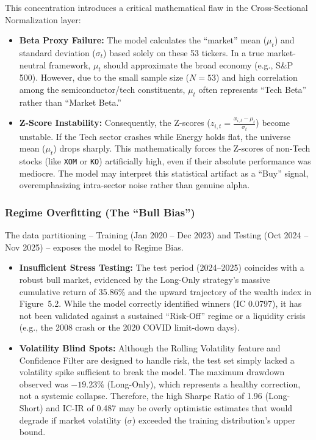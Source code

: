 \documentclass[twoside,final]{hcmut-report}
\begin{document}
This concentration introduces a critical mathematical flaw in the Cross-Sectional Normalization layer:
\begin{itemize}
  \item \textbf{Beta Proxy Failure:} The model calculates the ``market'' mean ($\mu_t$) and standard deviation ($\sigma_t$) based solely on these 53 tickers. In a true market-neutral framework, $\mu_t$ should approximate the broad economy (e.g., S\&P 500). However, due to the small sample size ($N=53$) and high correlation among the semiconductor/tech constituents, $\mu_t$ often represents ``Tech Beta'' rather than ``Market Beta.''
  \item \textbf{Z-Score Instability:} Consequently, the Z-scores \big($z_{i,t} = \frac{x_{i,t} - \mu_t}{\sigma_t}$\big) become unstable. If the Tech sector crashes while Energy holds flat, the universe mean ($\mu_t$) drops sharply. This mathematically forces the Z-scores of non-Tech stocks (like \texttt{XOM} or \texttt{KO}) artificially high, even if their absolute performance was mediocre. The model may interpret this statistical artifact as a ``Buy'' signal, overemphasizing intra-sector noise rather than genuine alpha.
\end{itemize}

\subsubsection{Regime Overfitting (The ``Bull Bias'')}
The data partitioning -- Training (Jan 2020 -- Dec 2023) and Testing (Oct 2024 -- Nov 2025) -- exposes the model to Regime Bias.
\begin{itemize}
  \item \textbf{Insufficient Stress Testing:} The test period (2024--2025) coincides with a robust bull market, evidenced by the Long-Only strategy’s massive cumulative return of 35.86\% and the upward trajectory of the wealth index in Figure~5.2. While the model correctly identified winners (IC 0.0797), it has not been validated against a sustained ``Risk-Off'' regime or a liquidity crisis (e.g., the 2008 crash or the 2020 COVID limit-down days).
  \item \textbf{Volatility Blind Spots:} Although the Rolling Volatility feature and Confidence Filter are designed to handle risk, the test set simply lacked a volatility spike sufficient to break the model. The maximum drawdown observed was $-19.23\%$ (Long-Only), which represents a healthy correction, not a systemic collapse. Therefore, the high Sharpe Ratio of 1.96 (Long-Short) and IC-IR of 0.487 may be overly optimistic estimates that would degrade if market volatility ($\sigma$) exceeded the training distribution's upper bound.
\end{itemize}
\end{document}

